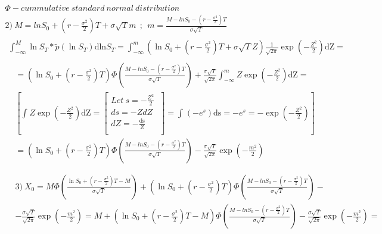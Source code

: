 \documentclass[12pt, a4paper]{article}
\begin{document}
\begin{enumerate}
\[\begin{matrix}
\Phi - cummulative\ standard\ normal\ distribution \\
2)\ M = lnS_{0} + \left( r - \frac{\sigma^{2}}{2} \right)T + \sigma\sqrt{T}m\ \ ;\ \ m = \frac{M - lnS_{0} - \left( r - \frac{\sigma^{2}}{2} \right)T}{\sigma\sqrt{T}} \\
\begin{matrix}
\int_{- \infty}^{M}{\ln S_{T}*\tilde{p}\left( \ln S_{T} \right)\text{dln}S_{T}} = \int_{- \infty}^{m}{\left( \ln S_{0} + \left( r - \frac{\sigma^{2}}{2} \right)T + \sigma\sqrt{T}Z \right)\frac{1}{\sqrt{2\pi}}\exp{\left( - \frac{Z^{2}}{2} \right)\text{dZ}} =} \\
\begin{matrix}
\begin{matrix}
 = \left( \ln S_{0} + \left( r - \frac{\sigma^{2}}{2} \right)T \right)\Phi\left( \frac{M - lnS_{0} - \left( r - \frac{\sigma^{2}}{2} \right)T}{\sigma\sqrt{T}} \right) + \frac{\sigma\sqrt{T}}{\sqrt{2\pi}}\int_{- \infty}^{m}{Z\exp{\left( - \frac{Z^{2}}{2} \right)\text{dZ}}} = \\
\left\lbrack \int_{}^{}{Z\exp{\left( - \frac{Z^{2}}{2} \right)\text{dZ}} =}\begin{bmatrix}
Let\ s = - \frac{Z^{2}}{2}\  \\
ds = - ZdZ \\
dZ = - \frac{\text{ds}}{Z} \\
\end{bmatrix} = \int_{}^{}{\left( - e^{s} \right)\text{ds}} = - e^{s} = - \exp\left( - \frac{Z^{2}}{2} \right) \right\rbrack \\
 = \left( \ln S_{0} + \left( r - \frac{\sigma^{2}}{2} \right)T \right)\Phi\left( \frac{M - lnS_{0} - \left( r - \frac{\sigma^{2}}{2} \right)T}{\sigma\sqrt{T}} \right) - \frac{\sigma\sqrt{T}}{\sqrt{2\pi}}\exp\left( - \frac{m^{2}}{2} \right) \\
\end{matrix} \\
\begin{matrix}
3)\ X_{0} = M\Phi\left( \frac{\ln S_{0} + \left( r - \frac{\sigma^{2}}{2} \right)T - M}{\sigma\sqrt{T}} \right) + \left( \ln S_{0} + \left( r - \frac{\sigma^{2}}{2} \right)T \right)\Phi\left( \frac{M - lnS_{0} - \left( r - \frac{\sigma^{2}}{2} \right)T}{\sigma\sqrt{T}} \right) - \\
 - \frac{\sigma\sqrt{T}}{\sqrt{2\pi}}\exp\left( - \frac{m^{2}}{2} \right) = M + \left( \ln S_{0} + \left( r - \frac{\sigma^{2}}{2} \right)T - M \right)\Phi\left( \frac{M - lnS_{0} - \left( r - \frac{\sigma^{2}}{2} \right)T}{\sigma\sqrt{T}} \right) - \frac{\sigma\sqrt{T}}{\sqrt{2\pi}}\exp\left( - \frac{m^{2}}{2} \right) = \\
\end{matrix} \\
\end{matrix} \\
\end{matrix} \\
\end{matrix}\]


\end{enumerate}
\end{document}
